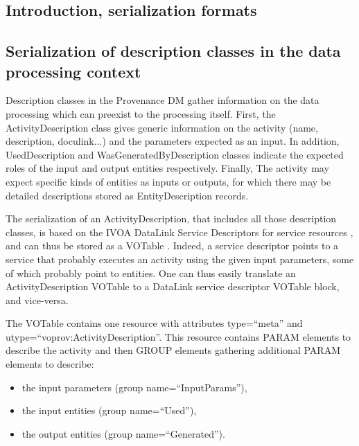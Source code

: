 \subsection{Introduction, serialization formats}
\label{sec:intro-serialization}


\subsection{Serialization of description classes in the data processing context}
\label{sec:description-serialization}

Description classes in the Provenance DM gather information
 on the data processing which can preexist to the processing itself.
First, the ActivityDescription class gives generic information on the activity (name, description, doculink...) and the parameters expected as an input. In addition, UsedDescription and WasGeneratedByDescription classes indicate the expected roles of the input and output entities respectively. Finally, The activity may expect specific kinds of entities as inputs or outputs, for which there may be detailed descriptions stored as EntityDescription records.

The serialization of an ActivityDescription, that includes all those description classes, is based on the IVOA DataLink Service Descriptors for service resources \citep{std:Datalink}, and can thus be stored as a VOTable  \citep{std:VOTABLE}. Indeed, a service descriptor points to a service that probably executes an activity using the given input parameters, some of which probably point to entities. One can thus easily translate an ActivityDescription VOTable to a DataLink service descriptor VOTable block, and vice-versa. 

The VOTable contains one resource with attributes type=``meta'' and utype=``voprov:ActivityDescription''. This resource contains PARAM elements to describe the activity and then GROUP elements gathering additional PARAM elements to describe:
\begin{itemize}
 \item the input parameters (group name=``InputParams''),
 \item the input entities (group name=``Used''),
 \item the output entities (group name=``Generated''). 
 \end{itemize} 

